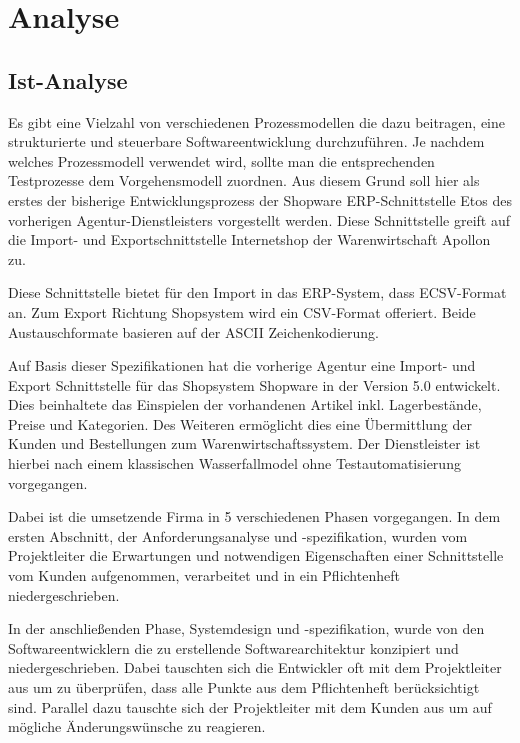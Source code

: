 \newpage
\section{Analyse}

\subsection{Ist-Analyse}
Es gibt eine Vielzahl von verschiedenen Prozessmodellen die dazu beitragen, eine strukturierte und steuerbare Softwareentwicklung durchzuführen. Je nachdem welches Prozessmodell verwendet wird,
sollte man die entsprechenden Testprozesse dem Vorgehensmodell zuordnen. Aus diesem Grund soll hier als erstes der bisherige Entwicklungsprozess der  Shopware ERP-Schnittstelle Etos des vorherigen Agentur-Dienstleisters vorgestellt werden. Diese Schnittstelle greift auf die \dq{}Import- und Exportschnittstelle Internetshop\dq{} der Warenwirtschaft Apollon zu. 

Diese Schnittstelle bietet für den Import in das ERP-System, dass ECSV-Format an. Zum Export Richtung Shopsystem wird ein CSV-Format offeriert. Beide Austauschformate basieren auf der ASCII Zeichenkodierung. 

Auf Basis dieser Spezifikationen hat die vorherige Agentur eine Import- und Export Schnittstelle für das Shopsystem Shopware in der Version 5.0 entwickelt. Dies beinhaltete das Einspielen der vorhandenen Artikel inkl. Lagerbestände, Preise und Kategorien. Des Weiteren ermöglicht dies eine Übermittlung der Kunden und Bestellungen zum Warenwirtschaftssystem. Der Dienstleister ist hierbei nach einem klassischen Wasserfallmodel ohne Testautomatisierung vorgegangen. 

Dabei ist die umsetzende Firma in 5 verschiedenen Phasen vorgegangen. In dem ersten Abschnitt, der Anforderungsanalyse und -spezifikation, wurden vom Projektleiter die Erwartungen und notwendigen Eigenschaften einer Schnittstelle vom Kunden aufgenommen, verarbeitet und in ein Pflichtenheft niedergeschrieben.

In der anschließenden Phase, Systemdesign und -spezifikation, wurde von den Softwareentwicklern die zu erstellende Softwarearchitektur konzipiert und niedergeschrieben. Dabei tauschten sich die Entwickler oft mit dem Projektleiter aus um zu überprüfen, dass alle Punkte aus dem Pflichtenheft berücksichtigt sind. Parallel dazu tauschte sich der Projektleiter mit dem Kunden aus um auf mögliche Änderungswünsche zu reagieren.

